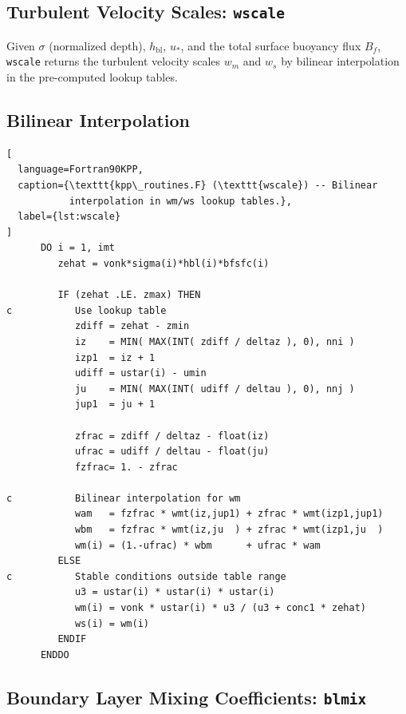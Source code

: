 \documentclass[12pt,letterpaper]{article}
\newcommand{\hbl}{h_{\mathrm{bl}}}
\newcommand{\ustar}{u_*}
\newcommand{\wm}{w_m}
\newcommand{\ws}{w_s}
\newcommand{\bfsfc}{B_f}
\begin{document}
\subsection{Turbulent Velocity Scales: \texttt{wscale}}  
\label{subsec:wscale}  
  
Given $\sigma$ (normalized depth), $\hbl$, $\ustar$, and the total  
surface buoyancy flux $\bfsfc$, \texttt{wscale} returns the turbulent  
velocity scales $\wm$ and $\ws$ by bilinear interpolation in the  
pre-computed lookup tables.  
  
\subsection{Bilinear Interpolation}  
  
\begin{lstlisting}[  
  language=Fortran90KPP,  
  caption={\texttt{kpp\_routines.F} (\texttt{wscale}) -- Bilinear  
           interpolation in wm/ws lookup tables.},  
  label={lst:wscale}  
]  
      DO i = 1, imt  
         zehat = vonk*sigma(i)*hbl(i)*bfsfc(i)  
  
         IF (zehat .LE. zmax) THEN  
c           Use lookup table  
            zdiff = zehat - zmin  
            iz    = MIN( MAX(INT( zdiff / deltaz ), 0), nni )  
            izp1  = iz + 1  
            udiff = ustar(i) - umin  
            ju    = MIN( MAX(INT( udiff / deltau ), 0), nnj )  
            jup1  = ju + 1  
  
            zfrac = zdiff / deltaz - float(iz)  
            ufrac = udiff / deltau - float(ju)  
            fzfrac= 1. - zfrac  
  
c           Bilinear interpolation for wm  
            wam   = fzfrac * wmt(iz,jup1) + zfrac * wmt(izp1,jup1)  
            wbm   = fzfrac * wmt(iz,ju  ) + zfrac * wmt(izp1,ju  )  
            wm(i) = (1.-ufrac) * wbm      + ufrac * wam  
         ELSE  
c           Stable conditions outside table range  
            u3 = ustar(i) * ustar(i) * ustar(i)  
            wm(i) = vonk * ustar(i) * u3 / (u3 + conc1 * zehat)  
            ws(i) = wm(i)  
         ENDIF  
      ENDDO  
\end{lstlisting}  
  
\subsection{Boundary Layer Mixing Coefficients: \texttt{blmix}}  
\label{subsec:blmix}  
  
\end{document}
